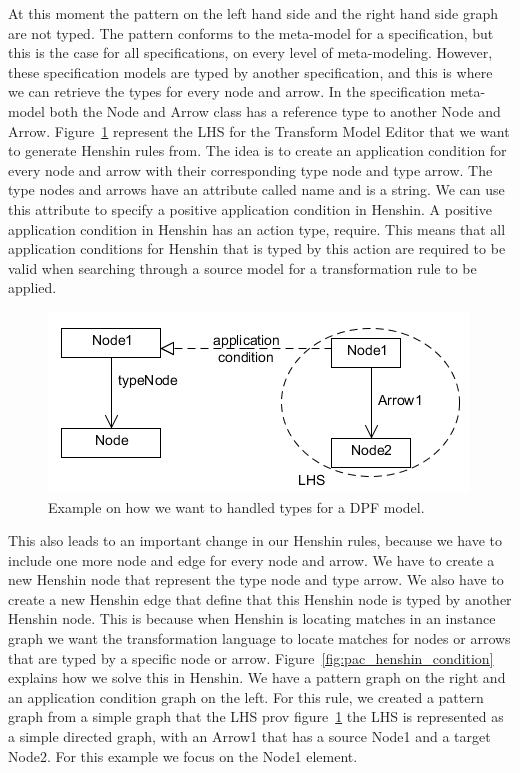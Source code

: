 At this moment the pattern on the left hand side and the right hand side graph
are not typed. The pattern conforms to the meta-model for a specification, but
this is the case for all specifications, on every level of meta-modeling. However,
these specification models are typed by another specification, and this is
where we can retrieve the types for every node and arrow. In the specification
meta-model both the Node and Arrow class has a reference type to another Node
and Arrow. Figure~\ref{fig:pac_henshin} represent the LHS for the
Transform Model Editor that we want to generate Henshin rules from. The idea is
to create an application condition for every node and arrow with their
corresponding type node and type arrow. The type nodes and arrows have an
attribute called name and is a string. We can use this attribute to specify a
positive application condition in Henshin. A positive application condition in
Henshin has an action type, require. This means that all application conditions
for Henshin that is typed by this action are required to be valid when searching
through a source model for a transformation rule to be applied. 

\begin{figure}[H] 
	\centering
	\includegraphics[scale=0.7]{./Figures/PAC_Henshin.png}
	\caption[How we want to handled types for a DPF model]
	{Example on how we want to handled types for a DPF model.}
	\label{fig:pac_henshin}
\end{figure}

This also leads to an important change in our Henshin rules, because we have to
include one more node and edge for every node and arrow. We have to create a new
Henshin node that represent the type node and type arrow. We also have to create
a new Henshin edge that define that this Henshin node is typed by another
Henshin node. This is because when Henshin is locating matches in an instance
graph we want the transformation language to locate matches for nodes or
arrows that are typed by a specific node or arrow. 
Figure~\ref{fig:pac_henshin_condition} explains how we solve this in Henshin.
We have a pattern graph on the right and an application condition graph on the
left. For this rule, we created a pattern graph from a simple graph that the LHS
prov figure~\ref{fig:pac_henshin} the LHS is represented as a simple
directed graph, with an Arrow1 that has a source Node1 and a target Node2. For
this example we focus on the Node1 element.

